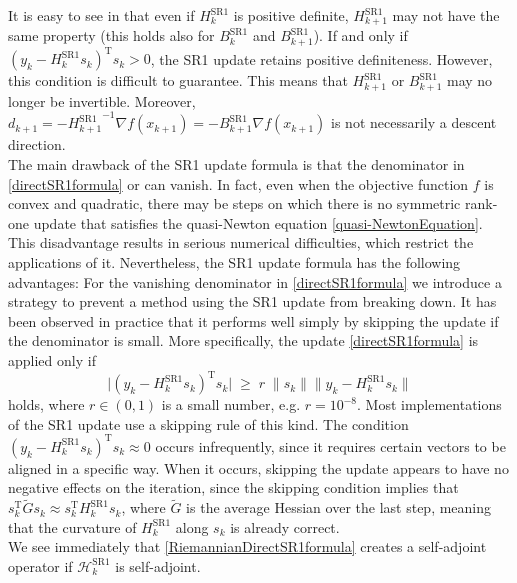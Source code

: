 It is easy to see in that even if $H^\mathrm{SR1}_k$ is positive definite, $H^\mathrm{SR1}_{k+1}$ may not have the same property (this holds also for $B^\mathrm{SR1}_k$ and $B^\mathrm{SR1}_{k+1}$). If and only if $(y_k - H^\mathrm{SR1}_k s_k)^{\mathrm{T}} s_k > 0$, the SR1 update retains positive definiteness. However, this condition is difficult to guarantee. This means that $H^\mathrm{SR1}_{k+1}$ or $B^\mathrm{SR1}_{k+1}$ may no longer be invertible. Moreover, $d_{k+1} = -{H^\mathrm{SR1}_{k+1}}^{-1} \nabla f(x_{k+1}) = -B^\mathrm{SR1}_{k+1} \nabla f(x_{k+1})$ is not necessarily a descent direction. \\
The main drawback of the SR1 update formula is that the denominator in \cref{directSR1formula} or   can vanish. In fact, even when the objective function $f$ is convex and quadratic, there may be steps on which there is no symmetric rank-one update that satisfies the quasi-Newton equation \cref{quasi-NewtonEquation}. This disadvantage results in serious numerical difficulties, which restrict the applications of it. Nevertheless, the SR1 update formula has the following advantages:
For the vanishing denominator in \cref{directSR1formula} we introduce a strategy to prevent a method using the SR1 update from breaking down. It has been observed in practice that it performs well simply by skipping the update if the denominator is small. More specifically, the update \cref{directSR1formula} is applied only if 
\begin{equation}
    \lvert (y_k - H^\mathrm{SR1}_k s_k)^{\mathrm{T}} s_k \lvert \; \geq \; r \; \lVert s_k \rVert \lVert y_k - H^\mathrm{SR1}_k s_k \rVert 
\end{equation}
holds, where $r \in (0, 1)$ is a small number, e.g. $r = 10^{−8}$. Most implementations of the SR1 update use a skipping rule of this kind. The condition $(y_k - H^\mathrm{SR1}_k s_k)^{\mathrm{T}} s_k \approx 0$ occurs infrequently, since it requires certain vectors to be aligned in a specific way. When it occurs, skipping the update appears to have no negative effects on the iteration, since the skipping condition implies that $s^{\mathrm{T}}_k \tilde{G} s_k \approx s^{\mathrm{T}}_k H^\mathrm{SR1}_k s_k$, where $\tilde{G}$ is the average Hessian over the last step, meaning that the curvature of $H^\mathrm{SR1}_k$ along $s_k$ is already correct. \\



We see immediately that \cref{RiemannianDirectSR1formula} creates a self-adjoint operator if $\mathcal{H}^\mathrm{SR1}_k$ is self-adjoint. 

